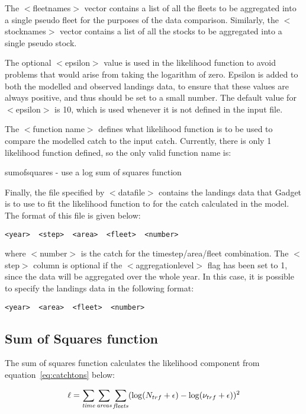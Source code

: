 \documentclass [a4paper, 10pt]{book}
\begin{document}
\bigskip
The $<$fleetnames$>$ vector contains a list of all the fleets to be aggregated into a single pseudo fleet for the purposes of the data comparison.  Similarly, the $<$stocknames$>$ vector contains a list of all the stocks to be aggregated into a single pseudo stock.

\bigskip
The optional $<$epsilon$>$ value is used in the likelihood function to avoid problems that would arise from taking the logarithm of zero.  Epsilon is added to both the modelled and observed landings data, to ensure that these values are always positive, and thus should be set to a small number.  The default value for $<$epsilon$>$ is 10, which is used whenever it is not defined in the input file.

\bigskip
The $<$function name$>$ defines what likelihood function is to be used to compare the modelled catch to the input catch.  Currently, there is only 1 likelihood function defined, so the only valid function name is:

\bigskip
sumofsquares - use a log sum of squares function

\bigskip
Finally, the file specified by $<$datafile$>$ contains the landings data that Gadget is to use to fit the likelihood function to for the catch calculated in the model.  The format of this file is given below:

{\small\begin{verbatim}
<year>  <step>  <area>  <fleet>  <number>
\end{verbatim}}

where $<$number$>$ is the catch for the timestep/area/fleet combination.  The $<$step$>$ column is optional if the $<$aggregationlevel$>$ flag has been set to 1, since the data will be aggregated over the whole year.  In this case, it is possible to specify the landings data in the following format:

{\small\begin{verbatim}
<year>  <area>  <fleet>  <number>
\end{verbatim}}

\subsection{Sum of Squares function}
The sum of squares function calculates the likelihood component from equation~\ref{eq:catchtons} below:

\begin{equation}\label{eq:catchtons}
\ell = \sum_{\it time}\sum_{\it areas}\sum_{\it fleets} (\log(N_{trf} + \epsilon) - \log(\nu_{trf} + \epsilon))^2
\end{equation}
\end{document}
